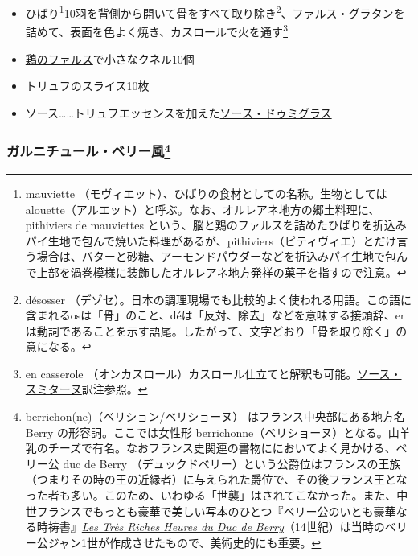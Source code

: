 \begin{recette}
\begin{itemize}
\item
  ひばり\footnote{mauviette
    （モヴィエット）、ひばりの食材としての名称。生物としてはalouette（アルエット）と呼ぶ。なお、オルレアネ地方の郷土料理に、
    pithiviers de mauviettes
    という、脳と鶏のファルスを詰めたひばりを折込みパイ生地で包んで焼いた料理があるが、pithiviers（ピティヴィエ）とだけ言う場合は、バターと砂糖、アーモンドパウダーなどを折込みパイ生地で包んで上部を渦巻模様に装飾したオルレアネ地方発祥の菓子を指すので注意。}10羽を背側から開いて骨をすべて取り除き\footnote{désosser
    （デゾセ）。日本の調理現場でも比較的よく使われる用語。この語に含まれるosは「骨」のこと、déは「反対、除去」などを意味する接頭辞、erは動詞であることを示す語尾。したがって、文字どおり「骨を取り除く」の意になる。}、\protect\hyperlink{farce-gratin-c}{ファルス・グラタン}を詰めて、表面を色よく焼き、カスロールで火を通す\footnote{en
    casserole
    （オンカスロール）カスロール仕立てと解釈も可能。\protect\hyperlink{sauce-smitane}{ソース・スミターヌ}訳注参照。}
\item
  \protect\hyperlink{farce-b}{鶏のファルス}で小さなクネル10個
\item
  トリュフのスライス10枚
\item
  ソース\ldots{}\ldots{}トリュフエッセンスを加えた\protect\hyperlink{sauce-demi-glace}{ソース・ドゥミグラス}
\end{itemize}

\hypertarget{garniture-berrichonne}{%
\subsubsection[ガルニチュール・ベリー風]{\texorpdfstring{ガルニチュール・ベリー風\footnote{berrichon(ne)（ベリション/ベリショーヌ）
  はフランス中央部にある地方名 Berry の形容詞。ここでは女性形
  berrichonne（ベリショーヌ）となる。山羊乳のチーズで有名。なおフランス史関連の書物ににおいてよく見かける、ベリー公
  duc de Berry
  （デュックドベリー）という公爵位はフランスの王族（つまりその時の王の近縁者）に与えられた爵位で、その後フランス王となった者も多い。このため、いわゆる「世襲」はされてこなかった。また、中世フランスでもっとも豪華で美しい写本のひとつ『ベリー公のいとも豪華なる時祷書』\href{http://gallica.bnf.fr/ark:/12148/btv1b520004510}{\emph{Les
  Très Riches Heures du Duc de
  Berry}}（14世紀）は当時のベリー公ジャン1世が作成させたもので、美術史的にも重要。}}{ガルニチュール・ベリー風}}\label{garniture-berrichonne}}



\end{recette}
